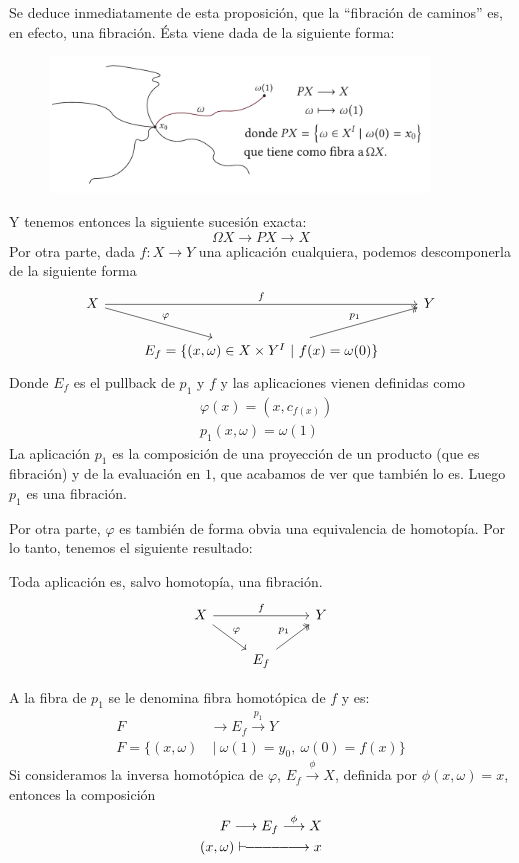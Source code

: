 Se deduce inmediatamente de esta proposición, que la ``fibración de caminos'' es, en efecto, una fibración. Ésta viene dada de la siguiente forma: \par
\begin{figure}[h]
\centering
\includegraphics[width = 0.9\textwidth]{images/fibraccaminos}
\end{figure}

Y tenemos entonces la siguiente sucesión exacta:
\[ \Omega X \longrightarrow PX \longrightarrow X \]
Por otra parte, dada $f: X \longrightarrow Y$ una aplicación cualquiera, podemos descomponerla de la siguiente forma
\[
\begin{tikzcd}
X \arrow{rr}{f} \drar{\varphi} & & Y \\
 & E_f = \{ (x, \omega ) \in X \times Y^I \ \vert \ f(x) = \omega(0) \} \urar[twoheadrightarrow]{p_1} &
\end{tikzcd}
\]
Donde $E_f$ es el pullback de $p_1$ y $f$ y las aplicaciones vienen definidas como 
\begin{align*}
&\varphi(x) = (x, c_{f(x)}) \\
&p_1(x, \omega) = \omega(1)
\end{align*}
La aplicación $p_1$ es la composición de una proyección de un producto (que es fibración) y de la evaluación en $1$, que acabamos de ver que también lo es. Luego $p_1$ es una fibración. \par 
Por otra parte, $\varphi$ es también de forma obvia una equivalencia de homotopía. Por lo tanto, tenemos el siguiente resultado:
\begin{teor}
Toda aplicación es, salvo homotopía, una fibración. 
\[
\begin{tikzcd}
X \arrow{rr}{f} \drar{\varphi} & & Y \\
 & E_f  \urar[twoheadrightarrow]{p_1} &
\end{tikzcd}
\]
\end{teor}
A la fibra de $p_1$ se le denomina fibra homotópica de $f$ y es:
\begin{align*}
F &\longrightarrow E_f \stackrel{p_1}{\longrightarrow} Y \\
F = \{ (x, \omega) & \ \vert \ \omega(1) = y_0, \ \omega(0) = f(x) \}
\end{align*}
Si consideramos la inversa homotópica de $\varphi$, $E_f \stackrel{\phi}{\longrightarrow} X$, definida por $\phi(x, \omega) = x$, entonces la composición 
\begin{align*}
F \longrightarrow E_f \stackrel{\phi}{\longrightarrow} X \\
(x, \omega) \vdash\joinrel\relbar\joinrel\relbar\joinrel\relbar\joinrel\relbar\joinrel\relbar\joinrel\relbar\joinrel\rightarrow x
\end{align*}

